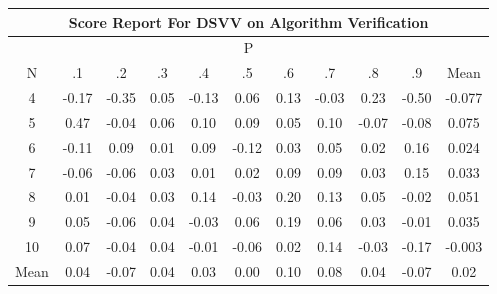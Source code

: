 \documentclass[11pt,a4paper]{report}
\begin{document}
\begin{longtable}{ | c || c | c | c | c | c | c | c | c | c || c |}
\hline
\multicolumn{11}{|c|}{ Score Report For DSVV on Algorithm Verification} \\
\hline
\multicolumn{11}{|c|}{ P } \\
\hline
N & .1 & .2 & .3 & .4 & .5 & .6 & .7 & .8 & .9 & Mean\\
 \hline
 \hline
 \endhead
  4 &  \cellcolor[HTML]{FFF7F7} -0.17 &  \cellcolor[HTML]{FFF7F7} -0.35 &  \cellcolor[HTML]{FFFFFF} 0.05 &  \cellcolor[HTML]{FFFFFF} -0.13 &  \cellcolor[HTML]{FFFFFF} 0.06 &  \cellcolor[HTML]{FFFFFF} 0.13 &  \cellcolor[HTML]{FFFFFF} -0.03 &  \cellcolor[HTML]{F7F7FF} 0.23 &  \cellcolor[HTML]{FFEFEF} -0.50 & -0.077 \\
  5 &  \cellcolor[HTML]{F7F7FF} 0.47 &  \cellcolor[HTML]{FFFFFF} -0.04 &  \cellcolor[HTML]{FFFFFF} 0.06 &  \cellcolor[HTML]{FFFFFF} 0.10 &  \cellcolor[HTML]{FFFFFF} 0.09 &  \cellcolor[HTML]{FFFFFF} 0.05 &  \cellcolor[HTML]{FFFFFF} 0.10 &  \cellcolor[HTML]{FFFFFF} -0.07 &  \cellcolor[HTML]{FFFFFF} -0.08 & 0.075 \\
  6 &  \cellcolor[HTML]{FFFFFF} -0.11 &  \cellcolor[HTML]{FFFFFF} 0.09 &  \cellcolor[HTML]{FFFFFF} 0.01 &  \cellcolor[HTML]{FFFFFF} 0.09 &  \cellcolor[HTML]{FFFFFF} -0.12 &  \cellcolor[HTML]{FFFFFF} 0.03 &  \cellcolor[HTML]{FFFFFF} 0.05 &  \cellcolor[HTML]{FFFFFF} 0.02 &  \cellcolor[HTML]{FFFFFF} 0.16 & 0.024 \\
  7 &  \cellcolor[HTML]{FFFFFF} -0.06 &  \cellcolor[HTML]{FFFFFF} -0.06 &  \cellcolor[HTML]{FFFFFF} 0.03 &  \cellcolor[HTML]{FFFFFF} 0.01 &  \cellcolor[HTML]{FFFFFF} 0.02 &  \cellcolor[HTML]{FFFFFF} 0.09 &  \cellcolor[HTML]{FFFFFF} 0.09 &  \cellcolor[HTML]{FFFFFF} 0.03 &  \cellcolor[HTML]{FFFFFF} 0.15 & 0.033 \\
  8 &  \cellcolor[HTML]{FFFFFF} 0.01 &  \cellcolor[HTML]{FFFFFF} -0.04 &  \cellcolor[HTML]{FFFFFF} 0.03 &  \cellcolor[HTML]{FFFFFF} 0.14 &  \cellcolor[HTML]{FFFFFF} -0.03 &  \cellcolor[HTML]{F7F7FF} 0.20 &  \cellcolor[HTML]{FFFFFF} 0.13 &  \cellcolor[HTML]{FFFFFF} 0.05 &  \cellcolor[HTML]{FFFFFF} -0.02 & 0.051 \\
  9 &  \cellcolor[HTML]{FFFFFF} 0.05 &  \cellcolor[HTML]{FFFFFF} -0.06 &  \cellcolor[HTML]{FFFFFF} 0.04 &  \cellcolor[HTML]{FFFFFF} -0.03 &  \cellcolor[HTML]{FFFFFF} 0.06 &  \cellcolor[HTML]{F7F7FF} 0.19 &  \cellcolor[HTML]{FFFFFF} 0.06 &  \cellcolor[HTML]{FFFFFF} 0.03 &  \cellcolor[HTML]{FFFFFF} -0.01 & 0.035 \\
  10 &  \cellcolor[HTML]{FFFFFF} 0.07 &  \cellcolor[HTML]{FFFFFF} -0.04 &  \cellcolor[HTML]{FFFFFF} 0.04 &  \cellcolor[HTML]{FFFFFF} -0.01 &  \cellcolor[HTML]{FFFFFF} -0.06 &  \cellcolor[HTML]{FFFFFF} 0.02 &  \cellcolor[HTML]{FFFFFF} 0.14 &  \cellcolor[HTML]{FFFFFF} -0.03 &  \cellcolor[HTML]{FFF7F7} -0.17 & -0.003 \\
 \hline
 \hline
Mean &  \cellcolor[HTML]{FFFFFF} 0.04 &  \cellcolor[HTML]{FFFFFF} -0.07 &  \cellcolor[HTML]{FFFFFF} 0.04 &  \cellcolor[HTML]{FFFFFF} 0.03 &  \cellcolor[HTML]{FFFFFF} 0.00 &  \cellcolor[HTML]{FFFFFF} 0.10 &  \cellcolor[HTML]{FFFFFF} 0.08 &  \cellcolor[HTML]{FFFFFF} 0.04 &  \cellcolor[HTML]{FFFFFF} -0.07 &  \cellcolor[HTML]{FFFFFF} 0.02
\end{longtable}
\end{document}
